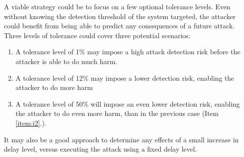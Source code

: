  
A viable strategy could be to focus on a few optional tolerance levels. Even without knowing the detection threshold of the system targeted, the attacker could benefit from being able to predict any consequences of a future attack. Three levels of tolerance could cover three potential scenarios:
\begin{enumerate}
    \item A tolerance level of 1\% may impose a high attack detection risk before the attacker is able to do much harm.
    \item A tolerance level of 12\% may impose a lower detection risk, enabling the attacker to do more harm
\label{item:i2}    \item A tolerance level of 50\% will impose an even lower detection risk, enabling the attacker to do even more harm, than in the previous case (Item \ref{item:i2}.).
   
\end{enumerate}

It may also be a good approach to determine any effects of a small increase in delay level, versus executing the attack using a fixed delay level.




